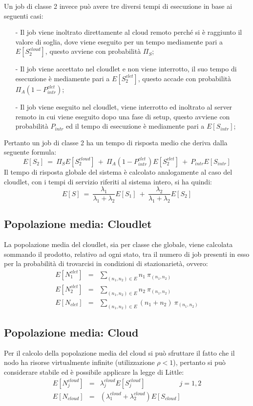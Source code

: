 Un job di classe 2 invece può avere tre diversi tempi di esecuzione in base ai
seguenti casi:
\begin{itemize}
\item[-]Il job viene inoltrato direttamente al cloud remoto perché si è
raggiunto il valore di soglia, dove viene eseguito per un tempo mediamente pari
a $E[S_2^{cloud}]$, questo avviene con probabilità $\Pi_S$;
\item[-]Il job viene accettato nel cloudlet e non viene interrotto, il suo tempo
di esecuzione è mediamente pari a $E[S_2^{clet}]$, questo accade con probabilità
$\Pi_A (1 - P_{intr}^{clet})$;
\item[-]Il job viene eseguito nel cloudlet, viene interrotto ed inoltrato al
server remoto in cui viene eseguito dopo una fase di setup, questo avviene con
probabilità $P_{intr}$ ed il tempo di esecuzione è mediamente pari a 
$E[S_{intr}]$; 
\end{itemize}
Pertanto un job di classe 2 ha un tempo di risposta medio che deriva dalla
seguente formula:
\begin{equation}
E[S_2] \ = \
\Pi_S E[S_2^{cloud}] \ + \ \Pi_A (1-P_{intr}^{clet}) E[S_2^{clet}] \ + \ 
P_{intr} E[S_{intr}]
\end{equation}
Il tempo di risposta globale del sistema è calcolato analogamente al caso del
cloudlet, con i tempi di servizio riferiti al sistema intero, si ha quindi:
\begin{equation}
E[S] \ = \
\frac{\lambda_1}{\lambda_1+\lambda_2}  E[S_1] \ + \
\frac{\lambda_2}{\lambda_1+\lambda_2}  E[S_2] 
\end{equation}
%
%
\subsection{Popolazione media: Cloudlet}
La popolazione media del cloudlet, sia per classe che globale, viene calcolata
sommando il prodotto, relativo ad ogni stato, tra il numero di job presenti in
esso per la probabilità di trovarcisi in condizioni di stazionarietà, ovvero:
\begin{eqnarray}
E[N_1^{clet}] &=& \sum_{(n_1,n_2) \in E} n_1 \ \pi_{(n_1,n_2)} \\
E[N_2^{clet}] &=& \sum_{(n_1,n_2) \in E} n_2 \ \pi_{(n_1,n_2)} \\
E[N_{clet}] &=& \sum_{(n_1,n_2) \in E} (n_1+n_2) \ \pi_{(n_1,n_2)} 
\end{eqnarray}
%
\subsection{Popolazione media: Cloud}
Per il calcolo della popolazione media del cloud si può sfruttare il fatto che
il nodo ha risorse virtualmente infinite (utilizzazione $\rho < 1$), pertanto si
può considerare stabile ed è possibile applicare la legge di Little:
\begin{eqnarray}
E[N_j^{cloud}] &=& \lambda_j^{cloud} E[S_j^{cloud}]  \qquad\quad\qquad j=1,2 \\
E[N_{cloud}] &=& (\lambda_1^{cloud} + \lambda_2^{cloud}) E[S_{cloud}]
\end{eqnarray}
%
